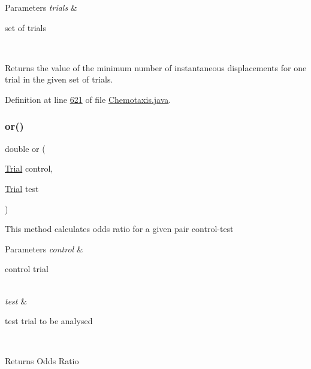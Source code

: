 \begin{DoxyParams}{Parameters}
{\em trials} & 
\begin{DoxyItemize}
\item set of trials 
\end{DoxyItemize}\\
\hline
\end{DoxyParams}
\begin{DoxyReturn}{Returns}
the value of the minimum number of instantaneous displacements for one trial in the given set of trials. 
\end{DoxyReturn}


Definition at line \hyperlink{_chemotaxis_8java_source_l00621}{621} of file \hyperlink{_chemotaxis_8java_source}{Chemotaxis.\+java}.

\hypertarget{classanalysis_1_1_chemotaxis_a4cf45f4c73ebe44a71a622c690f0b331}{}\label{classanalysis_1_1_chemotaxis_a4cf45f4c73ebe44a71a622c690f0b331} 
\subsubsection{\texorpdfstring{or()}{or()}}
{\footnotesize\ttfamily double or (\begin{DoxyParamCaption}\item[{\hyperlink{classdata_1_1_trial}{Trial}}]{control,  }\item[{\hyperlink{classdata_1_1_trial}{Trial}}]{test }\end{DoxyParamCaption})\hspace{0.3cm}{\ttfamily [private]}}

This method calculates odds ratio for a given pair control-\/test


\begin{DoxyParams}{Parameters}
{\em control} & 
\begin{DoxyItemize}
\item control trial 
\end{DoxyItemize}\\
\hline
{\em test} & 
\begin{DoxyItemize}
\item test trial to be analysed 
\end{DoxyItemize}\\
\hline
\end{DoxyParams}
\begin{DoxyReturn}{Returns}
Odds Ratio 
\end{DoxyReturn}


